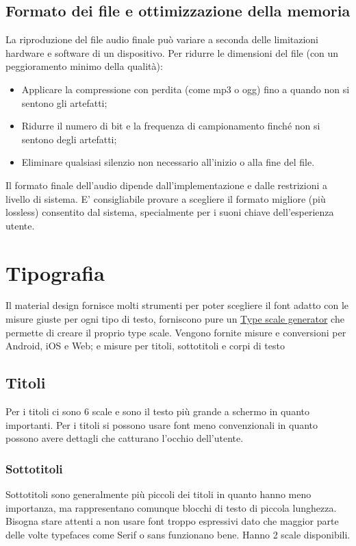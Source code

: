 \documentclass[12pt, a4paper]{report}
\begin{document}
                \subsection{Formato dei file e ottimizzazione della memoria}
                La riproduzione del file audio finale può variare a seconda delle limitazioni hardware e software di un dispositivo. Per ridurre le dimensioni del file (con un peggioramento minimo della qualità):
                \begin{itemize}
                    \item Applicare la compressione con perdita (come mp3 o ogg) fino a quando non si sentono gli artefatti;
                    \item Ridurre il numero di bit e la frequenza di campionamento finché non si sentono degli artefatti;
                    \item Eliminare qualsiasi silenzio non necessario all'inizio o alla fine del file.
                \end{itemize}
                Il formato finale dell'audio dipende dall'implementazione e dalle restrizioni a livello di sistema. E' consigliabile provare a scegliere il formato migliore (più lossless) consentito dal sistema, specialmente per i suoni chiave dell'esperienza utente.





	\section{Tipografia}
		Il material design fornisce molti strumenti per poter scegliere il font adatto con le misure giuste per ogni tipo di testo, forniscono pure un \href{https://material.io/design/typography/the-type-system.html#type-scale}{Type scale generator} che permette di creare il proprio type scale.
		Vengono fornite misure e conversioni per Android, iOS e Web; e misure per titoli, sottotitoli e corpi di testo
		\subsection{Titoli}
			Per i titoli ci sono 6 scale e sono il testo più grande a schermo in quanto importanti.
			Per i titoli si possono usare font meno convenzionali in quanto possono avere dettagli che catturano l'occhio dell'utente.
		\subsubsection{Sottotitoli}
			Sottotitoli sono generalmente più piccoli dei titoli in quanto hanno meno importanza, ma rappresentano comunque blocchi di testo di piccola lunghezza. Bisogna stare attenti a non usare font troppo espressivi dato che maggior parte delle volte typefaces come Serif o sans funzionano bene.
			Hanno 2 scale disponibili.
\end{document}
